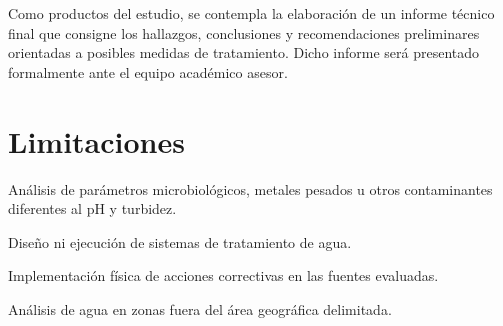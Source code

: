 Como productos del estudio, se contempla la elaboración de un informe técnico final que consigne los hallazgos, conclusiones y recomendaciones preliminares orientadas a posibles medidas de tratamiento. Dicho informe será presentado formalmente ante el equipo académico asesor.

\section{Limitaciones}
Análisis de parámetros microbiológicos, metales pesados u otros contaminantes diferentes al pH y turbidez.

Diseño ni ejecución de sistemas de tratamiento de agua.

Implementación física de acciones correctivas en las fuentes evaluadas.

Análisis de agua en zonas fuera del área geográfica delimitada.